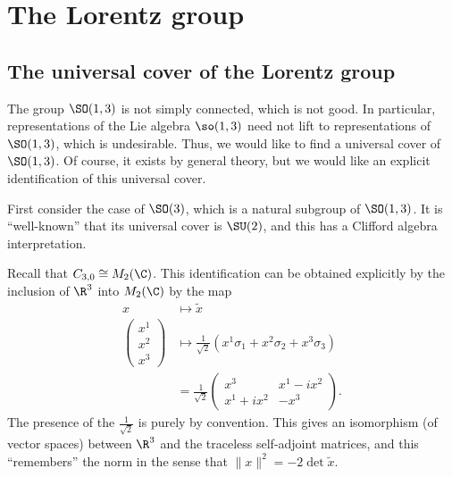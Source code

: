 \documentclass[a4paper]{article}
\begin{document}

\section{The Lorentz group}
\subsection{The universal cover of the Lorentz group}
The group $\SO(1, 3)$ is not simply connected, which is not good. In particular, representations of the Lie algebra $\so(1, 3)$ need not lift to representations of $\SO(1, 3)$, which is undesirable. Thus, we would like to find a universal cover of $\SO(1, 3)$. Of course, it exists by general theory, but we would like an explicit identification of this universal cover.

First consider the case of $\SO(3)$, which is a natural subgroup of $\SO(1, 3)$. It is ``well-known'' that its universal cover is $\SU(2)$, and this has a Clifford algebra interpretation.

Recall that $C_{3, 0} \cong M_2(\C)$. This identification can be obtained explicitly by the inclusion of $\R^3$ into $M_2(\C)$ by the map
\begin{align*}
  x &\mapsto \tilde{x}\\
  \begin{pmatrix}
    x^1\\x^2\\x^3
  \end{pmatrix}&\mapsto
  \frac{1}{\sqrt{2}}(x^1 \sigma_1 + x^2 \sigma_2 + x^3 \sigma_3) \\
  &= \frac{1}{\sqrt{2}}
  \begin{pmatrix}
    x^3 & x^1 - ix^2\\
    x^1 + i x^2 & -x^3
  \end{pmatrix}.
\end{align*}
The presence of the $\frac{1}{\sqrt{2}}$ is purely by convention. This gives an isomorphism (of vector spaces) between $\R^3$ and the traceless self-adjoint matrices, and this ``remembers'' the norm in the sense that $\|x\|^2 = - 2 \det \tilde{x}$.
\end{document}
